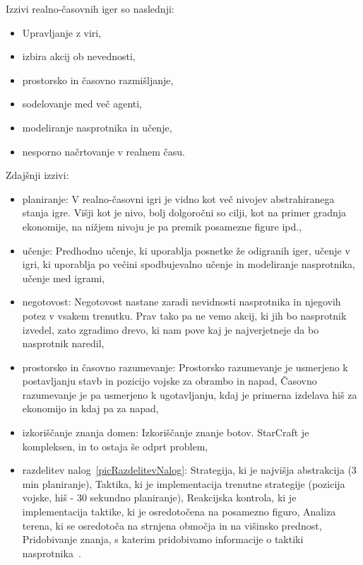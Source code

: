 \documentclass[a4paper, 12pt]{book}
\begin{document}
Izzivi realno-časovnih iger so naslednji:
\begin{itemize}
	\item Upravljanje z viri,
	\item izbira akcij ob nevednosti,
	\item prostorsko in časovno razmišljanje,
	\item sodelovanje med več agenti,
	\item modeliranje nasprotnika in učenje,
	\item nesporno načrtovanje v realnem času.
\end{itemize}

Zdajšnji izzivi:
\begin{itemize}
	\item planiranje: V realno-časovni igri je vidno kot več nivojev abstrahiranega stanja igre. 
	Višji kot je nivo, bolj dolgoročni so cilji, kot na primer gradnja ekonomije, na nižjem nivoju je pa premik posamezne figure ipd.,
	\item učenje: Predhodno učenje, ki uporablja posnetke že odigranih iger, učenje v igri, ki uporablja po večini spodbujevalno učenje in modeliranje nasprotnika, učenje med igrami,
	\item negotovost: Negotovost nastane zaradi nevidnosti nasprotnika in njegovih potez v vsakem trenutku. 
	Prav tako pa ne vemo akcij, ki jih bo nasprotnik izvedel, zato zgradimo drevo, ki nam pove kaj je najverjetneje da bo nasprotnik naredil,
	\item prostorsko in časovno razumevanje:
	Prostorsko razumevanje je usmerjeno k postavljanju stavb in pozicijo vojske za obrambo in napad,
	Časovno razumevanje je pa usmerjeno k ugotavljanju, kdaj je primerna izdelava hiš za ekonomijo in kdaj pa za napad,
	\item izkoriščanje znanja domen:
	Izkoriščanje znanje botov. 
	StarCraft je kompleksen, in to ostaja še odprt problem,
	\item razdelitev nalog~\ref{picRazdelitevNalog}:
	Strategija, ki je najvišja abstrakcija (3 min planiranje),
	Taktika, ki je implementacija trenutne strategije (pozicija vojske, hiš - 30 sekundno planiranje),
	Reakcijska kontrola, ki je implementacija taktike, ki je osredotočena na posamezno figuro,
	Analiza terena, ki se osredotoča na strnjena območja in na višinsko prednost,
	Pridobivanje znanja, s katerim pridobivamo informacije o taktiki nasprotnika~\cite{survey_real_time_strategy_ai_research_starcraft}.
	

\end{itemize}
\end{document}
